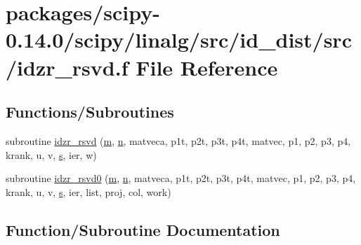 \hypertarget{idzr__rsvd_8f}{}\section{packages/scipy-\/0.14.0/scipy/linalg/src/id\+\_\+dist/src/idzr\+\_\+rsvd.f File Reference}
\label{idzr__rsvd_8f}
\subsection*{Functions/\+Subroutines}
\begin{DoxyCompactItemize}
\item 
subroutine \hyperlink{idzr__rsvd_8f_addac2acb29958664c12d50a801873da5}{idzr\+\_\+rsvd} (\hyperlink{indexexpr_8h_ab72fdb4031d47b75ab26dd18a437bcdc}{m}, \hyperlink{indexexpr_8h_ab427e2e2b4d6cec55fa088ea2a692ace}{n}, matveca, p1t, p2t, p3t, p4t, matvec, p1, p2, p3, p4, krank, u, v, \hyperlink{indexexpr_8h_ae024b0db549122b44c349ae28ec990dc}{s}, ier, w)
\item 
subroutine \hyperlink{idzr__rsvd_8f_af497cb6d9d172369fccdc0f64638e297}{idzr\+\_\+rsvd0} (\hyperlink{indexexpr_8h_ab72fdb4031d47b75ab26dd18a437bcdc}{m}, \hyperlink{indexexpr_8h_ab427e2e2b4d6cec55fa088ea2a692ace}{n}, matveca, p1t, p2t, p3t, p4t, matvec, p1, p2, p3, p4, krank, u, v, \hyperlink{indexexpr_8h_ae024b0db549122b44c349ae28ec990dc}{s}, ier, list, proj, col, work)
\end{DoxyCompactItemize}


\subsection{Function/\+Subroutine Documentation}
\hypertarget{idzr__rsvd_8f_addac2acb29958664c12d50a801873da5}{}
